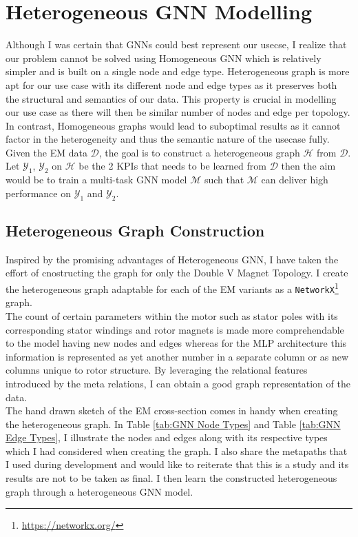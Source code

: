 \documentclass{report} %
\begin{document}
\section{Heterogeneous GNN Modelling}\label{sec:EM Heterogeneous GNN Model}
Although I was certain that \ac{GNN}s could best represent our usecse, I realize that our problem cannot be solved using Homogeneous \ac{GNN} which is relatively 
simpler and is built on a single node and edge type.
Heterogeneous graph is more apt for our use case with its different node and edge types as it preserves both the structural and semantics of our data. 
This property is crucial in modelling our use case as there will then be similar number of nodes and edge per topology. 
In contrast, Homogeneous graphs would lead to suboptimal results as it cannot factor in the heterogeneity and thus the semantic nature of the usecase fully. \\

Given the \ac{EM} data $\mathcal{D}$, the goal is to construct a heterogeneous graph $\mathcal{H}$ from $\mathcal{D}$. Let $\mathcal{Y}_1$, $\mathcal{Y}_2$ on 
$\mathcal{H}$ be the 2 \ac{KPI}s that needs to be learned from $\mathcal{D}$ then the aim would be to train a multi-task \ac{GNN} model $\mathcal{M}$ such that $\mathcal{M}$ can deliver 
high performance on $\mathcal{Y}_1$ and $\mathcal{Y}_2$.

\subsection{Heterogeneous Graph Construction}\label{subsec:EM Heterogeneous Graph Construction}
Inspired by the promising advantages of Heterogeneous \ac{GNN}, I have taken the effort of cnostructing the graph for only the Double V Magnet Topology.
I create the heterogeneous graph adaptable for each of the \ac{EM} variants as a \texttt{NetworkX}\footnote{\url{https://networkx.org/}} graph.\\
The count of certain parameters within the motor such as stator poles with its corresponding stator windings and rotor magnets is made more comprehendable to the 
model having new nodes and edges whereas for the \ac{MLP} architecture this information is represented as yet another number in a separate column or as new columns unique 
to rotor structure. 
By leveraging the relational features introduced by the meta relations, I can obtain a good graph representation of the data.\\
The hand drawn sketch of the \ac{EM} cross-section comes in handy when creating the heterogeneous graph. In Table \ref{tab:GNN Node Types} and Table \ref{tab:GNN Edge Types}, 
I illustrate the nodes and edges along with its respective types which I had considered when creating the graph. I also share the metapaths that I used during development and 
would like to reiterate that this is a study and its results are not to be taken as final.
I then learn the constructed heterogeneous graph through a heterogeneous \ac{GNN} model.  \\
\end{document}
